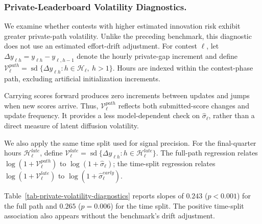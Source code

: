 \documentclass[mnsc]{informs3}
\begin{document}
\subsubsection{Private-Leaderboard Volatility Diagnostics.}
{We examine whether contests with higher estimated innovation risk exhibit greater private-path volatility. Unlike the preceding benchmark, this diagnostic does not use an estimated effort-drift adjustment. For contest $\ell$, let $\Delta y_{\ell h}=y_{\ell h}-y_{\ell,h-1}$ denote the hourly private-gap increment and define $\mathcal V_\ell^{path}=\operatorname{sd}\{\Delta y_{\ell h}:h\in\mathcal H_\ell,\ h>1\}$. Hours are indexed within the contest-phase path, excluding artificial initialization increments.}

{Carrying scores forward produces zero increments between updates and jumps when new scores arrive. Thus, $\mathcal V_\ell^{path}$ reflects both submitted-score changes and update frequency. It provides a less model-dependent check on $\hat\sigma_\ell$, rather than a direct measure of latent diffusion volatility.}

{We also apply the same time split used for signal precision. For the final-quarter hours $\mathcal H_\ell^{late}$, define $\mathcal V_\ell^{late}=\operatorname{sd}\{\Delta y_{\ell h}:h\in\mathcal H_\ell^{late}\}$. The full-path regression relates $\log(1+\mathcal V_\ell^{path})$ to $\log(1+\hat\sigma_\ell)$; the time-split regression relates $\log(1+\mathcal V_\ell^{late})$ to $\log(1+\hat\sigma_\ell^{early})$.}

Table~\ref{tab-private-volatility-diagnostics} reports slopes of $0.243$ ($p<0.001$) for the full path and $0.265$ ($p=0.006$) for the time split. The positive time-split association also appears without the benchmark's drift adjustment.
\end{document}
